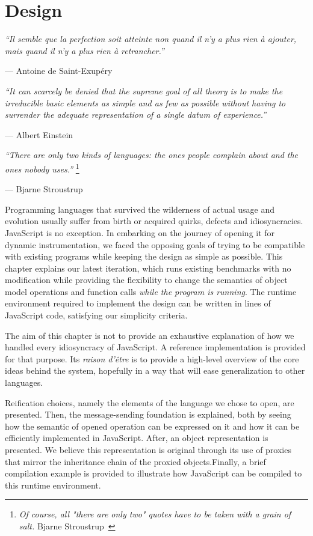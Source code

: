 \chapter{Design}
\label{chap:Design}
\emph{``Il semble que la perfection soit atteinte non quand il n'y a plus rien
\`a ajouter, mais quand il n'y a plus rien \`a retrancher.''}

\hfill --- Antoine de Saint-Exup\'ery

\emph{``It can scarcely be denied that the supreme goal of all theory is to
make the irreducible basic elements as simple and as few as possible without
having to surrender the adequate representation of a single datum of
experience.''}

\hfill --- Albert Einstein

\emph{``There are only two kinds of languages: the ones people complain about
and the ones nobody uses.''} \footnote{\emph{Of course, all "there are only
two" quotes have to be taken with a grain of salt.} Bjarne Stroustrup~\cite{stroustrup}}

\hfill --- Bjarne Stroustrup

Programming languages that survived the wilderness of actual usage and
evolution usually suffer from birth or acquired quirks, defects and
idiosyncracies. JavaScript is no exception. In embarking on the journey of
opening it for dynamic instrumentation, we faced the opposing goals of trying
to be compatible with existing programs while keeping the design as simple as
possible. This chapter explains our latest iteration, which runs existing
benchmarks with no modification while providing the flexibility to change the
semantics of object model operations and function calls \textit{while the
program is running}. The runtime environment required to implement the design
can be written in  lines
of JavaScript code, satisfying our simplicity criteria.

The aim of this chapter is not to provide an exhaustive explanation of how we
handled every idiosyncracy of JavaScript. A reference implementation is
provided for that purpose. Its \textit{raison d'\^etre} is to provide a
high-level overview of the core ideas behind the system, hopefully in a way
that will ease generalization to other languages.

Reification choices, namely the elements of the language we chose to open, are
presented. Then, the message-sending foundation is explained, both by seeing
how the semantic of opened operation can be expressed on it and how it can be
efficiently implemented in JavaScript. After, an object representation is
presented. We believe this representation is original through its use of
proxies that mirror the inheritance chain of the proxied objects.Finally, a brief compilation
example is provided to illustrate how JavaScript can be compiled to this
runtime environment.

